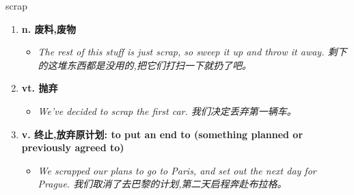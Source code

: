 
\begin{frame}
{\huge scrap}
\begin{center}
\begin{enumerate}\Large
  \item \textbf{n. 废料,废物}
  \begin{itemize}
    \item \em{\Large{The rest of this stuff is just scrap, so sweep it up and throw it away. 剩下的这堆东西都是没用的,把它们打扫一下就扔了吧。}}
  \end{itemize}
  \item \textbf{vt. 抛弃}
  \begin{itemize}
    \item \em{\Large{We've decided to scrap the first car. 我们决定丢弃第一辆车。}}
  \end{itemize}
  \item \textbf{v. 终止,放弃原计划: to put an end to (something planned or previously agreed to)}
  \begin{itemize}
    \item \em{\Large{We scrapped our plans to go to Paris, and set out the next day for Prague. 我们取消了去巴黎的计划,第二天启程奔赴布拉格。}}
  \end{itemize}
\end{enumerate}
\end{center}
\end{frame}
